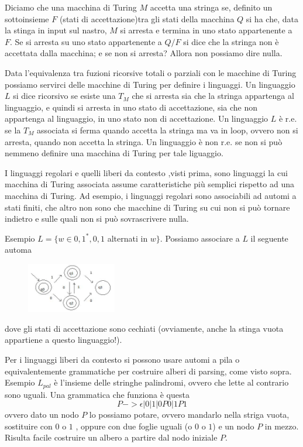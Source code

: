 Diciamo che una macchina di Turing $M$ accetta una stringa se, definito un sottoinsieme $F$ (stati di accettazione)tra gli stati della macchina $Q$ si ha che, data la stinga in input sul nastro, $M$ si arresta e termina in uno stato appartenente a $F$.
Se si arresta su uno stato appartenente a $Q/F$ si dice che la stringa non è accettata dalla macchina; e se non si arresta? Allora non possiamo dire nulla.

Data l'equivalenza tra fuzioni ricorsive totali o parziali con le macchine di Turing possiamo servirci delle macchine di Turing per definire i linguaggi. Un linguaggio $L$ si dice ricorsivo se esiste una $T_M$ che si arresta sia che la stringa appartenga al linguaggio, e quindi si arresta in uno stato di accettazione, sia che non appartenga al linguaggio, in uno stato non di accettazione. Un linguaggio $L$ è r.e. se la $T_M$ associata si ferma quando accetta la stringa ma va in loop, ovvero non si arresta, quando non accetta la stringa. Un linguaggio è non r.e. se non si può nemmeno definire una macchina di Turing per tale liguaggio.

I linguaggi regolari e quelli liberi da contesto ,visti prima, sono linguaggi la cui macchina di Turing associata assume caratteristiche più semplici rispetto ad una macchina di Turing. Ad esempio, i linguaggi regolari sono associabili ad automi a stati finiti, che altro non sono che macchine di Turing su cui non si può tornare indietro e sulle quali non si può sovrascrivere nulla.

Esempio $L=\{w\in{0,1}^*,0,1$ alternati in $w\}$. Possiamo associare a $L$ il seguente automa
\begin{figure}[h]
	\includegraphics[width=0.35\textwidth]{img/automa.JPG}
	\label{fig:Capture}
\end{figure} 

dove gli stati di accettazione sono cechiati (ovviamente, anche la stinga vuota appartiene a questo linguaggio!).

Per i linguaggi liberi da contesto si possono usare automi a pila o equivalentemente grammatiche per costruire alberi di parsing, come visto sopra. Esempio $L_{pal}$ è l'insieme delle stringhe palindromi, ovvero che lette al contrario sono uguali.
Una grammatica che funziona è questa
\[P->\epsilon|0|1|0P0|1P1\]
ovvero dato un nodo $P$ lo possiamo potare, ovvero mandarlo nella striga vuota, sostituire con $0$ o $1$ , oppure con due foglie uguali (o $0$ o $1$) e un nodo $P$ in mezzo. Risulta facile costruire un albero a partire dal nodo iniziale $P$.

